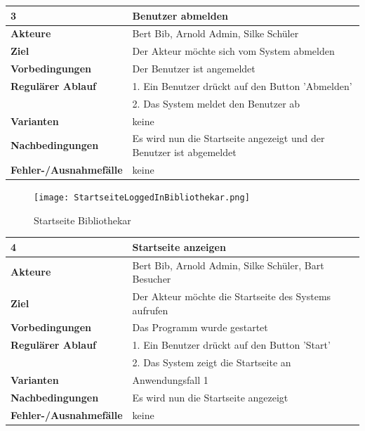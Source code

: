 \documentclass[fontsize=12pt,paper=a4,twoside]{scrartcl}
\begin{document}
\begin{table}
	[H] \label{3} 
	\begin{tabular}
		{|l|p{10cm}|} \hline \textbf{3} & \textbf{Benutzer abmelden} \\
		\hline \textbf{Akteure} & Bert Bib, Arnold Admin, Silke Schüler \\
		\hline \textbf{Ziel} & Der Akteur möchte sich vom System abmelden \\
		\hline \textbf{Vorbedingungen} & Der Benutzer ist angemeldet \\
		\hline \textbf{Regulärer Ablauf} & 1. Ein Benutzer drückt auf den Button 'Abmelden' \\
		&2. Das System meldet den Benutzer ab\\
		\hline \textbf{Varianten} & keine \\
		\hline \textbf{Nachbedingungen} & Es wird nun die Startseite angezeigt und der Benutzer ist abgemeldet\\
		\hline \textbf{Fehler-/Ausnahmefälle} & keine\\
		\hline 
	\end{tabular}
\end{table}
\begin{figure}
	[H] \caption{Startseite Bibliothekar} 
	\texttt{[image: StartseiteLoggedInBibliothekar.png]} \label{pic:StartBib} 
\end{figure}
\begin{table}
	[H] \label{4} 
	\begin{tabular}
		{|l|p{10cm}|} \hline \textbf{4} & \textbf{Startseite anzeigen} \\
		\hline \textbf{Akteure} & Bert Bib, Arnold Admin, Silke Schüler, Bart Besucher\\
		\hline \textbf{Ziel} & Der Akteur möchte die Startseite des Systems aufrufen \\
		\hline \textbf{Vorbedingungen} & Das Programm wurde gestartet \\
		\hline \textbf{Regulärer Ablauf} & 1. Ein Benutzer drückt auf den Button 'Start' \\
		&2. Das System zeigt die Startseite an\\
		\hline \textbf{Varianten} & Anwendungsfall 1 \\
		\hline \textbf{Nachbedingungen} & Es wird nun die Startseite angezeigt \\
		\hline \textbf{Fehler-/Ausnahmefälle} & keine\\
		\hline 
	\end{tabular}
\end{table}
\end{document}
